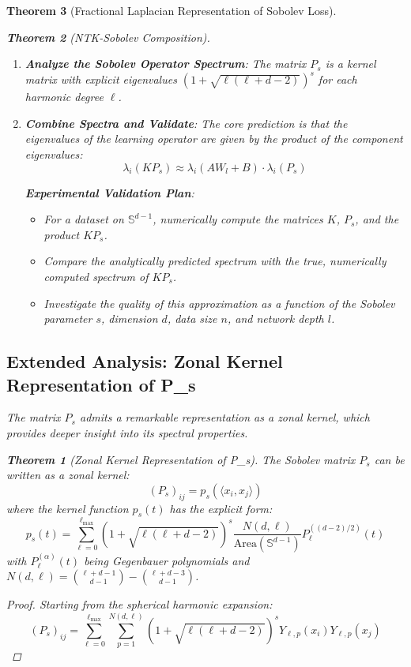 \documentclass{article}
\newtheorem{theorem}{Theorem}[section]
\begin{document}
\begin{theorem}[Fractional Laplacian Representation of Sobolev Loss]
\begin{theorem}[NTK-Sobolev Composition]
\begin{enumerate}
    \item \textbf{Analyze the Sobolev Operator Spectrum}:
    The matrix $P_s$ is a kernel matrix with explicit eigenvalues $(1 + \sqrt{\ell(\ell + d - 2)})^s$ for each harmonic degree $\ell$.

    \item \textbf{Combine Spectra and Validate}:
    The core prediction is that the eigenvalues of the learning operator are given by the product of the component eigenvalues:
    \[ \lambda_i(K P_s) \approx \lambda_i(A W_l + B) \cdot \lambda_i(P_s) \]
    
    \textbf{Experimental Validation Plan}:
    \begin{itemize}
        \item For a dataset on $\mathbb{S}^{d-1}$, numerically compute the matrices $K$, $P_s$, and the product $K P_s$.
        \item Compare the analytically predicted spectrum with the true, numerically computed spectrum of $K P_s$.
        \item Investigate the quality of this approximation as a function of the Sobolev parameter $s$, dimension $d$, data size $n$, and network depth $l$.
    \end{itemize}
\end{enumerate}



\subsection{Extended Analysis: Zonal Kernel Representation of P_s}

The matrix $P_s$ admits a remarkable representation as a zonal kernel, which provides deeper insight into its spectral properties.

\begin{theorem}[Zonal Kernel Representation of P_s]
The Sobolev matrix $P_s$ can be written as a zonal kernel:
\[ (P_s)_{ij} = p_s(\langle x_i, x_j \rangle) \]
where the kernel function $p_s(t)$ has the explicit form:
\[ p_s(t) = \sum_{\ell=0}^{\ell_{\max}} (1 + \sqrt{\ell(\ell + d - 2)})^s \frac{N(d,\ell)}{\text{Area}(\mathbb{S}^{d-1})} P_\ell^{((d-2)/2)}(t) \]
with $P_\ell^{(\alpha)}(t)$ being Gegenbauer polynomials and $N(d,\ell) = \binom{\ell+d-1}{d-1} - \binom{\ell+d-3}{d-1}$.
\end{theorem}

\begin{proof}
Starting from the spherical harmonic expansion:
\[ (P_s)_{ij} = \sum_{\ell=0}^{\ell_{\max}} \sum_{p=1}^{N(d,\ell)} (1 + \sqrt{\ell(\ell + d - 2)})^s Y_{\ell,p}(x_i) Y_{\ell,p}(x_j) \]


\end{proof}
\end{theorem}
\end{theorem}
\end{document}
